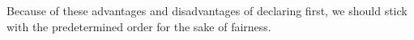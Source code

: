 \bigskip
Because of these advantages and disadvantages of declaring first, we should stick with the predetermined order for the sake of fairness.

\newpage

